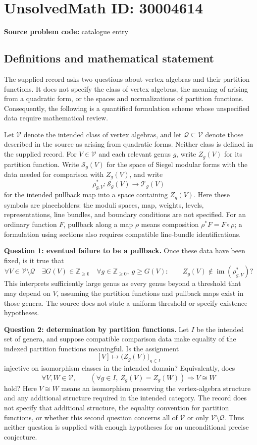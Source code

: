 \documentclass[11pt]{article}
\newcommand{\Z}{\mathbb{Z}}
\begin{document}
\section*{UnsolvedMath ID: 30004614}
\textbf{Source problem code:} catalogue entry
\subsection{Definitions and mathematical statement}
The supplied record asks two questions about vertex algebras and their partition functions. It does not specify the class of vertex algebras, the meaning of arising from a quadratic form, or the spaces and normalizations of partition functions. Consequently, the following is a quantified formulation scheme whose unspecified data require mathematical review.

Let \(\mathcal V\) denote the intended class of vertex algebras, and let \(\mathcal Q\subseteq\mathcal V\) denote those described in the source as arising from quadratic forms. Neither class is defined in the supplied record. For \(V\in\mathcal V\) and each relevant genus \(g\), write \(Z_g(V)\) for its partition function. Write \(\mathcal S_g(V)\) for the space of Siegel modular forms with the data needed for comparison with \(Z_g(V)\), and write
\[
\rho_{g,V}^{*}\colon\mathcal S_g(V)\longrightarrow\mathcal T_g(V)
\]
for the intended pullback map into a space containing \(Z_g(V)\). Here these symbols are placeholders: the moduli spaces, map, weights, levels, representations, line bundles, and boundary conditions are not specified. For an ordinary function \(F\), pullback along a map \(\rho\) means composition \(\rho^{*}F=F\circ\rho\); a formulation using sections also requires compatible line-bundle identifications.

\textbf{Question 1: eventual failure to be a pullback.} Once these data have been fixed, is it true that
\[
\forall V\in\mathcal V\setminus\mathcal Q\quad
\exists G(V)\in\Z_{\geq 0}\quad
\forall g\in\Z_{\geq 0},\ g\geq G(V):\qquad
Z_g(V)\notin\operatorname{im}(\rho_{g,V}^{*})?
\]
This interprets sufficiently large genus as every genus beyond a threshold that may depend on \(V\), assuming the partition functions and pullback maps exist in those genera. The source does not state a uniform threshold or specify existence hypotheses.

\textbf{Question 2: determination by partition functions.} Let \(I\) be the intended set of genera, and suppose compatible comparison data make equality of the indexed partition functions meaningful. Is the assignment
\[
[V]\longmapsto\bigl(Z_g(V)\bigr)_{g\in I}
\]
injective on isomorphism classes in the intended domain? Equivalently, does
\[
\forall V,W\in\mathcal V,\qquad
\left(\forall g\in I,\ Z_g(V)=Z_g(W)\right)
\Longrightarrow V\cong W
\]
hold? Here \(V\cong W\) means an isomorphism preserving the vertex-algebra structure and any additional structure required in the intended category. The record does not specify that additional structure, the equality convention for partition functions, or whether this second question concerns all of \(\mathcal V\) or only \(\mathcal V\setminus\mathcal Q\). Thus neither question is supplied with enough hypotheses for an unconditional precise conjecture.
\end{document}
